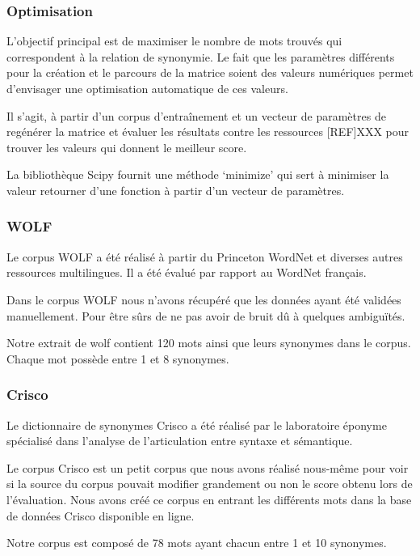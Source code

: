 \subsubsection{Optimisation}

L'objectif principal est de maximiser le nombre de mots trouvés qui 
correspondent à la relation de synonymie. Le fait que les paramètres différents 
pour la création et le parcours de la matrice soient des valeurs numériques 
permet d'envisager une optimisation automatique de 
ces valeurs.

Il s'agit, à partir d'un corpus d'entraînement et un vecteur de paramètres de 
regénérer la matrice et évaluer les résultats contre les ressources [REF]XXX 
pour trouver les valeurs qui donnent le meilleur score.

La bibliothèque Scipy fournit une méthode \lq{minimize}\rq{} qui sert à 
minimiser la valeur retourner d'une fonction à partir d'un vecteur de 
paramètres.

\subsubsection{WOLF}

Le corpus WOLF a été réalisé à partir du Princeton WordNet et diverses autres 
ressources multilingues. Il a été évalué par rapport au WordNet français.

Dans le corpus WOLF nous n'avons récupéré que les données ayant été validées 
manuellement. Pour être sûrs de ne pas avoir de bruit dû à quelques ambiguïtés.

Notre extrait de wolf contient 120 mots ainsi que leurs synonymes dans le 
corpus. Chaque mot possède entre 1 et 8 synonymes.

\subsubsection{Crisco}

Le dictionnaire de synonymes Crisco a été réalisé par le laboratoire éponyme 
spécialisé dans l’analyse de l’articulation entre syntaxe et sémantique.

Le corpus Crisco est un petit corpus que nous avons réalisé nous-même pour voir 
si la source du corpus pouvait modifier grandement ou non le score obtenu lors 
de l'évaluation. Nous avons créé ce corpus en entrant les différents mots dans 
la base de données Crisco disponible en ligne.

Notre corpus est composé de 78 mots ayant chacun entre 1 et 10 synonymes.


